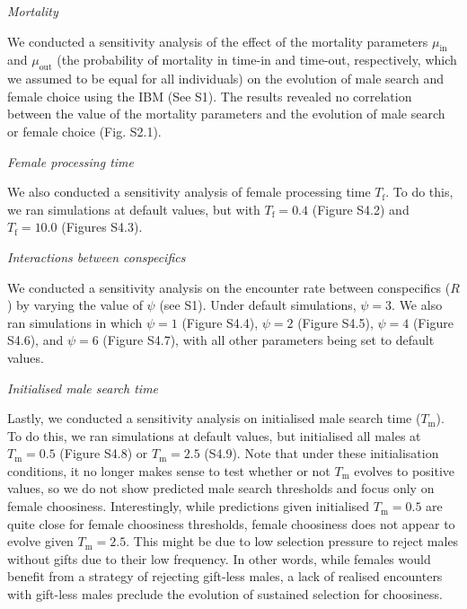 \documentclass[
]{article}
\begin{document}
\emph{Mortality}

We conducted a sensitivity analysis of the effect of the mortality
parameters \(\mu_{\mathrm{in}}\) and \(\mu_{\mathrm{out}}\) (the
probability of mortality in time-in and time-out, respectively, which we
assumed to be equal for all individuals) on the evolution of male search
and female choice using the IBM (See S1). The results revealed no
correlation between the value of the mortality parameters and the
evolution of male search or female choice (Fig. S2.1).

\emph{Female processing time}

We also conducted a sensitivity analysis of female processing time
\(T_{\mathrm{f}}\). To do this, we ran simulations at default values,
but with \(T_{\mathrm{f}} = 0.4\) (Figure S4.2) and
\(T_{\mathrm{f}} = 10.0\) (Figures S4.3).

\emph{Interactions between conspecifics}

We conducted a sensitivity analysis on the encounter rate between
conspecifics (\(R\)) by varying the value of \(\psi\) (see S1). Under
default simulations, \(\psi = 3\). We also ran simulations in which
\(\psi = 1\) (Figure S4.4), \(\psi = 2\) (Figure S4.5), \(\psi = 4\)
(Figure S4.6), and \(\psi = 6\) (Figure S4.7), with all other parameters
being set to default values.

\emph{Initialised male search time}

Lastly, we conducted a sensitivity analysis on initialised male search
time (\(T_{\mathrm{m}}\)). To do this, we ran simulations at default
values, but initialised all males at \(T_{\mathrm{m}} = 0.5\) (Figure
S4.8) or \(T_{\mathrm{m}} = 2.5\) (S4.9). Note that under these
initialisation conditions, it no longer makes sense to test whether or
not \(T_{\mathrm{m}}\) evolves to positive values, so we do not show
predicted male search thresholds and focus only on female choosiness.
Interestingly, while predictions given initialised
\(T_{\mathrm{m}} = 0.5\) are quite close for female choosiness
thresholds, female choosiness does not appear to evolve given
\(T_{\mathrm{m}} = 2.5\). This might be due to low selection pressure to
reject males without gifts due to their low frequency. In other words,
while females would benefit from a strategy of rejecting gift-less
males, a lack of realised encounters with gift-less males preclude the
evolution of sustained selection for choosiness.

\clearpage

\captionsetup{labelformat=empty}
\end{document}
